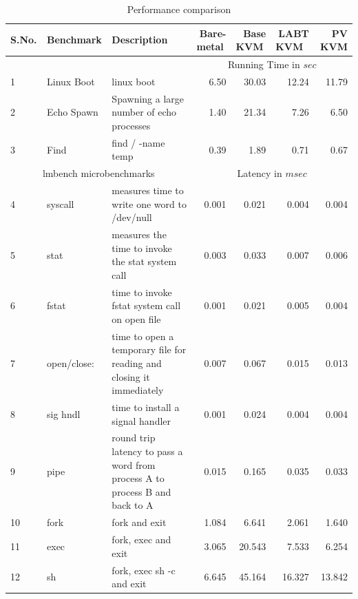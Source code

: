 \documentclass[10pt,twocolumn]{article}
\begin{document}
\begin{table}
\centering
\caption{Performance comparison}
      \begin{tabular}{|l| l|p{5cm} | r r r r|} \hline
	        S.No.\verb, ,&  Benchmark\verb, ,& Description  & Bare-metal \verb, ,& Base KVM \verb, , & LABT KVM \verb, ,& PV KVM \\ \hline

     &&& \multicolumn{4}{c|}{ Running Time in $sec$}\\\cline {4-7}  
      1&  Linux Boot& linux boot & 6.50	& 30.03	& 12.24	& 11.79 \\ \hline
      2& Echo Spawn	& Spawning a large number of echo processes&1.40	& 21.34 &	7.26 &	6.50 \\\hline
      3& Find	& find / -name temp & 0.39	& 1.89	& 0.71	& 0.67 \\ \hline
	   \multicolumn{3}{|c}{ lmbench microbenchmarks }& \multicolumn{4}{c|}{Latency in $msec$}\\  \hline

  4& syscall	& measures time to write one word to /dev/null&	0.001	&	0.021	&	0.004	&	0.004	\\\hline
5&stat	& measures the time to invoke the stat system call&	0.003	&	0.033	&	0.007	&	0.006	\\\hline
6&fstat	&time to invoke fstat system call on open file &	0.001	&	0.021	&	0.005	&	0.004	\\\hline
7&open/close:	& time to open a temporary file for reading and closing it immediately &	0.007	&	0.067	&	0.015	&	0.013	\\\hline
8&sig hndl	& time to install a signal handler&	0.001	&	0.024	&	0.004	&	0.004	\\\hline
9&pipe 	& round trip latency to pass a word from process A to process B and back to A&	0.015	&	0.165	&	0.035	&	0.033	\\\hline
10&fork	& fork and exit &	1.084	&	6.641	&	2.061	&	1.640	\\\hline
11&exec	& fork, exec and exit&	3.065	&	20.543	&	7.533	&	6.254	\\\hline
12&sh	& fork, exec sh -c and exit&	6.645	&	45.164	&	16.327	&	13.842	\\\hline


        \hline
      \end{tabular}
\label{tab:kvm_performance}
\end{table} 
\end{document}
